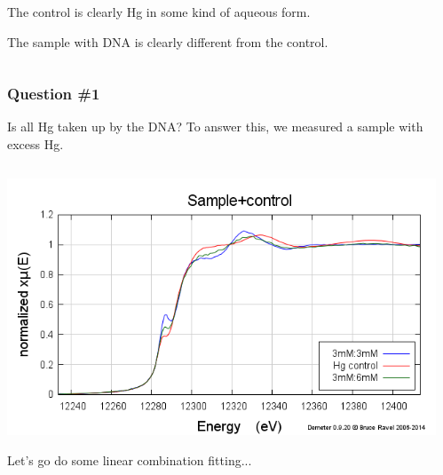 \documentclass[10pt, xcolor=x11names, compress]{beamer}
\begin{document}
\begin{frame}
\begin{columns}
\begin{column}{0.6\linewidth}
      \bigskip

      The control is clearly Hg in some kind of aqueous form.

      \bigskip

      The sample with DNA is clearly different from the control.
    \end{column}
  \end{columns}
\end{frame}

\begin{frame}
  \frametitle{Question \#1}
  \begin{exampleblock}{Is all Hg taken up by the DNA?}
    \centering To answer this, we measured a sample with excess Hg.
  \end{exampleblock}
  \begin{columns}[T]
    \begin{column}{0.5\linewidth}
      \includegraphics[width=\linewidth]{images/excess.png}

      \medskip

      Let's go do some linear combination fitting...
    \end{column}
    \begin{column}{0.5\linewidth}
    \end{column}
  \end{columns}
\end{frame}
\end{document}
